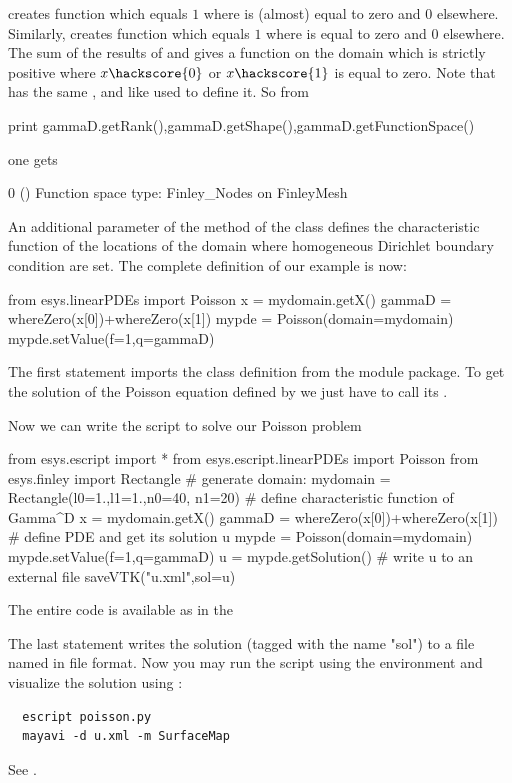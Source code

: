  creates function which equals $1$ where  is (almost) equal to zero 
and $0$ elsewhere. 
Similarly,  creates function which equals $1$ where  is 
equal to zero and $0$ elsewhere.
The sum of the results of  and  
gives a function on the domain  which is strictly positive where $x\hackscore{0}$ or $x\hackscore{1}$ is equal to zero.
Note that  has the same \Rank, \Shape and \FunctionSpace like  used to define it. So from 
\begin{python}
  print gammaD.getRank(),gammaD.getShape(),gammaD.getFunctionSpace()
\end{python}
one gets 
\begin{python}
  0 () Function space type: Finley_Nodes on FinleyMesh 
\end{python}
An additional parameter  of the  method of the \Poisson class defines the 
characteristic function  of the locations
of the domain where homogeneous Dirichlet boundary condition 
are set. The complete definition of our example is now: 
\begin{python}
  from esys.linearPDEs import Poisson
  x = mydomain.getX()
  gammaD = whereZero(x[0])+whereZero(x[1])
  mypde = Poisson(domain=mydomain)
  mypde.setValue(f=1,q=gammaD)
\end{python}
The first statement imports the \Poisson class definition from the \linearPDEs module \escript package.
To get the solution of the Poisson equation defined by  we just have to call its
. 

Now we can write the script to solve our Poisson problem
\begin{python}
  from esys.escript import *
  from esys.escript.linearPDEs import Poisson
  from esys.finley import Rectangle
  # generate domain:
  mydomain = Rectangle(l0=1.,l1=1.,n0=40, n1=20)
  # define characteristic function of Gamma^D
  x = mydomain.getX()
  gammaD = whereZero(x[0])+whereZero(x[1])
  # define PDE and get its solution u
  mypde = Poisson(domain=mydomain)
  mypde.setValue(f=1,q=gammaD)
  u = mypde.getSolution()
  # write u to an external file
  saveVTK("u.xml",sol=u)
\end{python}
The entire code is available as  in the \ExampleDirectory

The last statement writes the solution (tagged with the name "sol") to a file named  in 
\VTK file format.
Now you may run the script using the \escript environment
and visualize the solution using \mayavi:
\begin{verbatim}
  escript poisson.py
  mayavi -d u.xml -m SurfaceMap
\end{verbatim}
See .

